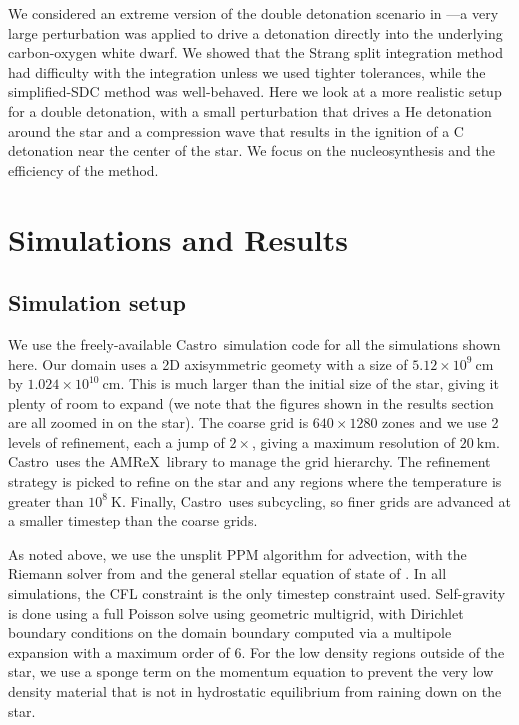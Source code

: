 \documentclass[modern]{aastex631}
\newcommand{\castro}{{\sf Castro}}
\newcommand{\amrex}{{\sf AMReX}}
\begin{document}
We considered an extreme version of the double detonation scenario in
\citet{castro_simple_sdc}---a very large perturbation was applied to
drive a detonation directly into the underlying carbon-oxygen white
dwarf.  We showed that the Strang split integration method had
difficulty with the integration unless we used tighter tolerances,
while the simplified-SDC method was well-behaved.  Here we look at a
more realistic setup for a double detonation, with a small
perturbation that drives a He detonation around the star and a
compression wave that results in the ignition of a C detonation near
the center of the star.  We focus on the nucleosynthesis and the
efficiency of the method.

\section{Simulations and Results}\label{Sec:results}

\subsection{Simulation setup}

We use the freely-available \castro\ simulation code for all the
simulations shown here.  Our domain uses a 2D axisymmetric geomety
with a size of $5.12\times 10^9~\mathrm{cm}$ by $1.024\times
10^{10}~\mathrm{cm}$.  This is much larger than the initial size of
the star, giving it plenty of room to expand (we note that the figures
shown in the results section are all zoomed in on the star).  The
coarse grid is $640\times 1280$ zones and we use 2 levels of
refinement, each a jump of $2\times$, giving a maximum resolution of
$20~\mathrm{km}$.  \castro\ uses the \amrex\ library
\citep{amrex_joss} to manage the grid hierarchy.  The refinement
strategy is picked to refine on the star and any regions where the
temperature is greater than $10^8~\mathrm{K}$.  Finally, \castro\ uses
subcycling, so finer grids are advanced at a smaller timestep than the
coarse grids.

As noted above, we use the unsplit PPM algorithm for advection, with
the Riemann solver from \citet{colellaglaz:1985} and the general
stellar equation of state of \citet{timmes_swesty:2000}.  In
all simulations, the CFL constraint is the
only timestep constraint used.  Self-gravity is done using a full
Poisson solve using geometric multigrid, with Dirichlet boundary
conditions on the domain boundary computed via a multipole expansion
with a maximum order of 6.  For the low density regions outside of the
star, we use a sponge term on the momentum equation to prevent the
very low density material that is not in hydrostatic equilibrium from
raining down on the star.
\end{document}
